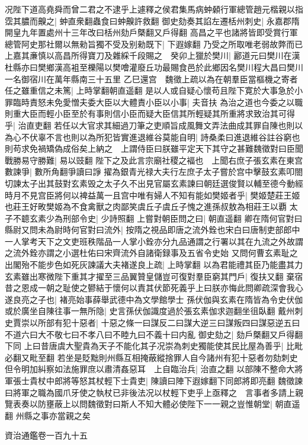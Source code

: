 况陛下道高堯舜而曾二君之不逮乎上遽釋之侯君集馬病蚛顙行軍總管趙元楷親以指霑其膿而齅之|{
	蚛直衆翻蟲食曰蚛齅許救翻}
御史劾奏其諂左遷栝州刺史|{
	永嘉郡隋開皇九年置處州十三年改曰栝州劾戶槩翻又戶得翻}
高昌之平也諸將皆即受賞行軍總管阿史那社爾以無勑旨獨不受及别勑既下|{
	下遐嫁翻}
乃受之所取唯老弱故弊而已上嘉其亷慎以高昌所得寶刀及雜綵千段賜之　癸卯上獵於樊川|{
	酈道元曰樊川在漢杜縣亦曰樊鄉漢高袓至櫟陽以樊噲灌廢丘功最賜食邑於此鄉因名樊川程大昌曰樊川一名御宿川在萬年縣南三十五里}
乙巳還宫　魏徵上疏以為在朝羣臣當樞機之寄者任之雖重信之未篤|{
	上時掌翻朝直遥翻}
是以人或自疑心懷苟且陛下寛於大事急於小罪臨時責怒未免愛憎夫委大臣以大體責小臣以小事|{
	夫音扶}
為治之道也今委之以職則重大臣而輕小臣至於有事則信小臣而疑大臣信其所輕疑其所重將求致治其可得乎|{
	治直吏翻}
若任以大官求其細過刀筆之吏順旨成風舞文弄法曲成其罪自陳也則以為心不伏辜不言也則以為所犯皆實進退維谷莫能自明|{
	詩桑柔曰進退維谷註谷窮也}
則苟求免禍矯偽成俗矣上納之　上謂侍臣曰朕雖平定天下其守之甚難魏徵對曰臣聞戰勝易守勝難|{
	易以豉翻}
陛下之及此言宗廟社稷之褔也　上聞右庶子張玄素在東宫數諫爭|{
	數所角翻爭讀曰諍}
擢為銀青光禄大夫行左庶子太子嘗於宫中擊鼓玄素叩閤切諫太子出其鼓對玄素毁之太子久不出見官屬玄素諫曰朝廷選俊賢以輔至德今動經時月不見宫臣將何以裨益萬一且宫中唯有婦人不知有能如樊姬者乎|{
	樊姬楚莊王姬也莊王好畋樊姬為不食禽獸之肉鄙笑虞丘子虞丘子愧之進孫叔敖為相莊王以覇}
太子不聼玄素少為刑部令史|{
	少詩照翻}
上嘗對朝臣問之曰|{
	朝直遥翻}
卿在隋何官對曰縣尉又問未為尉時何官對曰流外|{
	按隋之視品即唐之流外銓也宋白曰唐制吏部郎中一人掌考天下之文吏班秩階品一人掌小銓亦分九品通謂之行署以其在九流之外故謂之流外銓亦謂之小選杜佑曰宋齊流外自諸衛録事及五省令史始}
又問何曹玄素耻之出閣殆不能步色如死灰諫議大夫褚遂良上疏|{
	上時掌翻}
以為君能禮其臣乃能盡其力玄素雖出寒微陛下重其才擢至三品翼贊皇儲豈可復對羣臣窮其門戶|{
	復扶又翻}
棄宿昔之恩成一朝之耻使之鬰結于懷何以責其伏節死義乎上曰朕亦悔此問卿疏深會我心遂良亮之子也|{
	褚亮始事薛舉武德中為文學館學士}
孫伏伽與玄素在隋皆為令史伏伽或於廣坐自陳往事一無所隐|{
	史言孫伏伽識度過於張玄素伽求迦翻坐徂臥翻}
戴州刺史賈崇以所部有犯十惡者|{
	十惡之條一曰謀反二曰謀大逆三曰謀叛四曰謀惡逆五曰不道六曰大不敬七曰不孝八曰不睦九曰不義十曰内亂}
御史劾之|{
	劾戶槩翻又戶得翻下同}
上曰昔唐虞大聖貴為天子不能化其子况崇為刺史獨能使其民比屋為善乎|{
	比毗必翻又毗至翻}
若坐是貶黜則州縣互相掩蔽縱捨罪人自今諸州有犯十惡者勿劾刺史但令明加糾察如法施罪庶以肅清姦惡耳　上自臨治兵|{
	治直之翻}
以部陳不整命大將軍張士貴杖中郎將等怒其杖輕下士貴吏|{
	陳讀曰陣下遐嫁翻下同郎將即亮翻}
魏徵諫曰將軍之職為國爪牙使之執杖已非後法况以杖輕下吏乎上亟釋之　言事者多請上親覽表奏以防壅蔽上以問魏徵對曰斯人不知大體必使陛下一一親之豈惟朝堂|{
	朝直遥翻}
州縣之事亦當親之矣

資治通鑑卷一百九十五
